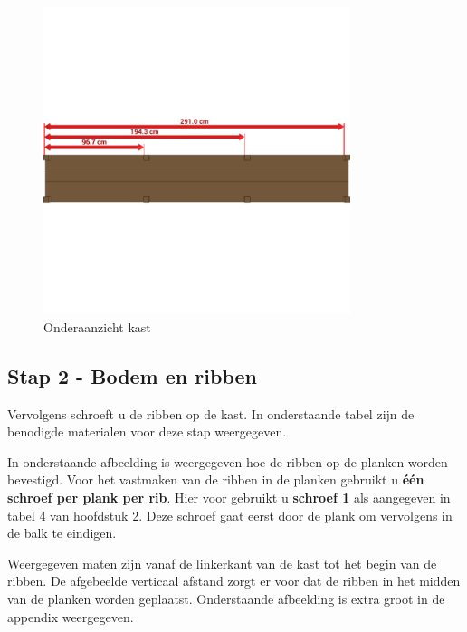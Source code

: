 \documentclass{article}
\begin{document}
\begin{figure}[h!]
    \centering
    \includegraphics[width=0.8\textwidth]{scene 1 - bottom.png}
    \caption{Onderaanzicht kast}
    \label{fig:stap 1}
\end{figure}

\clearpage
\newpage

\subsection{Stap 2 - Bodem en ribben}

Vervolgens schroeft u de ribben op de kast. In onderstaande tabel zijn de benodigde materialen voor deze stap weergegeven.



In onderstaande afbeelding is weergegeven hoe de ribben op de planken worden bevestigd. Voor het vastmaken van de ribben in de planken gebruikt u \textbf{\'{e}\'{e}n schroef per plank per rib}. Hier voor gebruikt u \textbf{schroef 1} als aangegeven in tabel 4 van hoofdstuk 2. Deze schroef gaat eerst door de plank om vervolgens in de balk te eindigen.

Weergegeven maten zijn vanaf de linkerkant van de kast tot het begin van de ribben. De afgebeelde verticaal afstand zorgt er voor dat de ribben in het midden van de planken worden geplaatst. Onderstaande afbeelding is extra groot in de appendix weergegeven.
\end{document}

